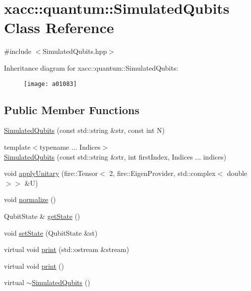 \hypertarget{a01083}{}\section{xacc\+:\+:quantum\+:\+:Simulated\+Qubits Class Reference}
\label{a01083}


{\ttfamily \#include $<$Simulated\+Qubits.\+hpp$>$}

Inheritance diagram for xacc\+:\+:quantum\+:\+:Simulated\+Qubits\+:\begin{figure}[H]
\begin{center}
\leavevmode
\texttt{[image: a01083]}
\end{center}
\end{figure}
\subsection*{Public Member Functions}
\begin{DoxyCompactItemize}
\item 
\hyperlink{a01083_abb0419229628210a1c187b76be6edc30}{Simulated\+Qubits} (const std\+::string \&str, const int N)
\item 
{\footnotesize template$<$typename ... Indices$>$ }\\\hyperlink{a01083_a812afe5bad306acfe2b46e05098040a4}{Simulated\+Qubits} (const std\+::string \&str, int first\+Index, Indices ... indices)
\item 
void \hyperlink{a01083_a3f4518d0135101141bf92d7e31f4fddc}{apply\+Unitary} (fire\+::\+Tensor$<$ 2, fire\+::\+Eigen\+Provider, std\+::complex$<$ double $>$$>$ \&U)
\item 
void \hyperlink{a01083_a09ee499769bb1eedaf08d6b5c29f9791}{normalize} ()
\item 
Qubit\+State \& \hyperlink{a01083_a405577717ca200ed9e524c04209e0216}{get\+State} ()
\item 
void \hyperlink{a01083_a8cd74c239c1fcecb3d03d6989732d5fe}{set\+State} (Qubit\+State \&st)
\item 
virtual void \hyperlink{a01083_a9252d30be0563f36bf1ff839c7104cd7}{print} (std\+::ostream \&stream)
\item 
virtual void \hyperlink{a01083_a32922bd2ccc64bba601c07a3c136cc3d}{print} ()
\item 
virtual \hyperlink{a01083_aebf6f30a6d8c84971091d87908680e7e}{$\sim$\+Simulated\+Qubits} ()
\end{DoxyCompactItemize}
